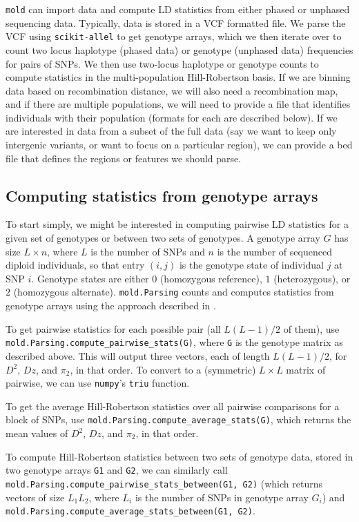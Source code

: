 \documentclass[10pt]{article}
\makeatletter
\newcommand{\mold}{\texttt{mold}\xspace}
\newcommand{\py}[1]{\lstinline[breaklines=true,language=Python, showstringspaces=False]@#1@}
\makeatother
\begin{document}
\mold can import data and compute LD statistics from either phased or unphased sequencing data.
Typically, data is stored in a VCF formatted file.
We parse the VCF using \py{scikit-allel} to get genotype arrays, which we then iterate over to count two locus haplotype (phased data) or genotype (unphased data) frequencies for pairs of SNPs.
We then use two-locus haplotype or genotype counts to compute statistics in the multi-population Hill-Robertson basis.
If we are binning data based on recombination distance, we will also need a recombination map, and if there are multiple populations, we will need to provide a file that identifies individuals with their population (formats for each are described below).
If we are interested in data from a subset of the full data (say we want to keep only intergenic variants, or want to focus on a particular region), we can provide a bed file that defines the regions or features we should parse.

\subsection{Computing statistics from genotype arrays}
To start simply, we might be interested in computing pairwise LD statistics for a given set of genotypes or between two sets of genotypes.
A genotype array $G$ has size $L\times n$, where $L$ is the number of SNPs and $n$ is the number of sequenced diploid individuals, so that entry $(i,j)$ is the genotype state of individual $j$ at SNP $i$.
Genotype states are either $0$ (homozygous reference), $1$ (heterozygous), or $2$ (homozygous alternate).
\py{mold.Parsing} counts and computes statistics from genotype arrays using the approach described in \citet{Ragsdale2019}.

To get pairwise statistics for each possible pair (all $L(L-1)/2$ of them), use \py{mold.Parsing.compute_pairwise_stats(G)}, where \py{G} is the genotype matrix as described above.
This will output three vectors, each of length $L(L-1)/2$, for $D^2$, $Dz$, and $\pi_2$, in that order.
To convert to a (symmetric) $L\times L$ matrix of pairwise, we can use \py{numpy}'s \py{triu} function.

To get the average Hill-Robertson statistics over all pairwise comparisons for a block of SNPs, use \py{mold.Parsing.compute_average_stats(G)}, which returns the mean values of $D^2$, $Dz$, and $\pi_2$, in that order.

To compute Hill-Robertson statistics between two sets of genotype data, stored in two genotype arrays \py{G1} and \py{G2}, we can similarly call \py{mold.Parsing.compute_pairwise_stats_between(G1, G2)} (which returns vectors of size $L_1L_2$, where $L_i$ is the number of SNPs in genotype array $G_i$) and \py{mold.Parsing.compute_average_stats_between(G1, G2)}.
\end{document}
